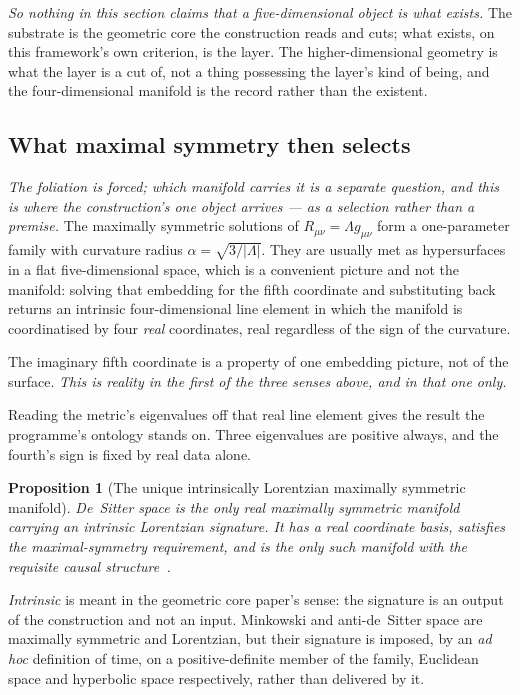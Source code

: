\documentclass[11pt,a4paper]{article}
\theoremstyle{plain}
\newtheorem{proposition}{Proposition}
\theoremstyle{definition}
\begin{document}
\emph{So nothing in this section claims that a five-dimensional object is what exists.} The substrate is the
geometric core the construction reads and cuts; what exists, on this framework's own criterion, is the layer.
The higher-dimensional geometry is what the layer is a cut of, not a thing possessing the layer's kind of
being, and the four-dimensional manifold is the record rather than the existent.

\subsection{What maximal symmetry then selects}

\emph{The foliation is forced; which manifold carries it is a separate question, and this is where the
construction's one object arrives --- as a selection rather than a premise.} The maximally symmetric
solutions of $R_{\mu\nu}=\Lambda g_{\mu\nu}$ form a one-parameter family with curvature radius
$\alpha=\sqrt{3/|\Lambda|}$. They are usually met as hypersurfaces in a flat five-dimensional space, which is
a convenient picture and not the manifold: solving that embedding for the fifth coordinate and substituting
back returns an intrinsic four-dimensional line element in which the manifold is coordinatised by four
\emph{real} coordinates, real regardless of the sign of the curvature.

The imaginary fifth coordinate is a property of one embedding picture, not of the surface. \emph{This is reality in the first of the
three senses above, and in that one only.}

Reading the metric's eigenvalues off that real line element gives the result the programme's ontology stands
on. Three eigenvalues are positive always, and the fourth's sign is fixed by real data alone.

\begin{proposition}[The unique intrinsically Lorentzian maximally symmetric manifold]\label{prop:substrate-unique}
De~Sitter space is the only real maximally symmetric manifold carrying an intrinsic Lorentzian signature.
It has a real coordinate basis, satisfies the maximal-symmetry requirement, and is the only such manifold
with the requisite causal structure~\cite{JanzenGeometricCore,JanzenThesis}.
\end{proposition}

\noindent \emph{Intrinsic} is meant in the geometric core paper's sense: the signature is an output of the construction and not an input. Minkowski and anti-de~Sitter space are maximally symmetric and Lorentzian, but their signature is imposed, by an \emph{ad hoc} definition of time, on a positive-definite member of the family, Euclidean space and hyperbolic space respectively, rather than delivered by it.
\end{document}
